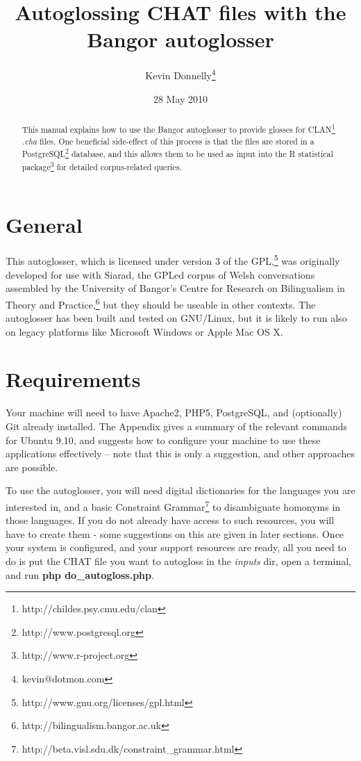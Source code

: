 \documentclass[a4paper,10pt]{article}
\title{\textbf{Autoglossing CHAT files with the Bangor autoglosser}}
\author{Kevin Donnelly\thanks{kevin@dotmon.com}}
\date{28 May 2010}
\begin{document}
\maketitle

\begin{abstract}
This manual explains how to use the Bangor autoglosser to provide glosses for  CLAN\footnote{http://childes.psy.cmu.edu/clan} \textit{.cha} files.  One beneficial side-effect of this process is that the files are stored in a PostgreSQL\footnote{http://www.postgresql.org} database, and this allows them to be used as input into the R statistical package\footnote{http://www.r-project.org} for detailed corpus-related queries.
\end{abstract}

\section{General}
\label{sec:general}

This autoglosser, which is licensed under version 3 of the GPL,\footnote{http://www.gnu.org/licenses/gpl.html} was originally developed for use with Siarad, the GPLed corpus of Welsh conversations assembled by the University of Bangor's Centre for Research on Bilingualism in Theory and Practice,\footnote{http://bilingualism.bangor.ac.uk} but they should be useable in other contexts.  The autoglosser has been built and tested on GNU/Linux, but it is likely to run also on legacy platforms like Microsoft Windows or Apple Mac OS X.

\section{Requirements}
\label{sec:requirements}

Your machine will need to have Apache2, PHP5, PostgreSQL, and (optionally) Git already installed.  The Appendix gives a summary of the relevant commands for Ubuntu 9.10, and suggests how to configure your machine to use these applications effectively -- note that this is only a suggestion, and other approaches are possible.

To use the autoglosser, you will need digital dictionaries for the languages you are interested in, and a basic Constraint Grammar\footnote{http://beta.visl.sdu.dk/constraint\_grammar.html} to disambiguate homonyms in those languages.  If you do not already have access to such resources, you will have to create them - some suggestions on this are given in later sections.   Once your system is configured, and your support resources are ready, all you need to do is put the CHAT file you want to autogloss in the \textit{inputs} dir, open a terminal, and run \textbf{php do\_autogloss.php}.
\end{document}
